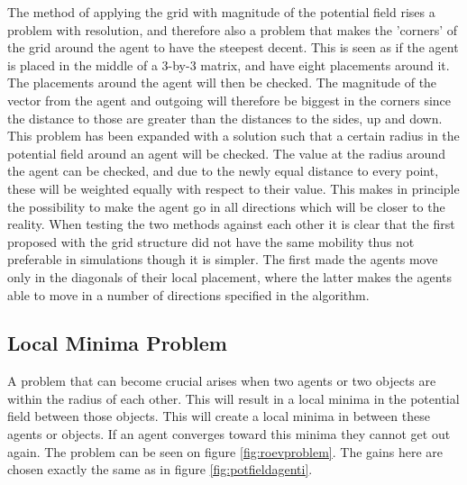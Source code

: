 \documentclass[a4paper,conference]{IEEEtran}
\begin{document}
The method of applying the grid with magnitude of the potential field
rises a problem with resolution, and therefore also a problem that
makes the 'corners' of the grid around the agent to have the steepest
decent. This is seen as if the agent is placed in the middle of a
3-by-3 matrix, and have eight placements around it. The placements
around the agent will then be checked. The magnitude of the vector
from the agent and outgoing will therefore be biggest in the corners
since the distance to those are greater than the distances to the
sides, up and down. This problem has been expanded with a solution
such that a certain radius in the potential field around an agent will
be checked. The value at the radius around the agent can be checked,
and due to the newly equal distance to every point, these will be
weighted equally with respect to their value. This makes in principle
the possibility to make the agent go in all directions which will be
closer to the reality. When testing the two methods against each other
it is clear that the first proposed with the grid structure did not
have the same mobility thus not preferable in simulations though it is
simpler. The first made the agents move only in the diagonals of their
local placement, where the latter makes the agents able to move in a
number of directions specified in the algorithm.

\subsection{Local Minima Problem}
A problem that can become crucial arises when two agents or two
objects are within the radius of each other. This will result in a
local minima in the potential field between those objects. This will
create a local minima in between these agents or objects. If an
agent converges toward this minima they cannot get out again. The
problem can be seen on figure \ref{fig:roevproblem}. The gains here
are chosen exactly the same as in figure \ref{fig:potfieldagenti}.
\end{document}
